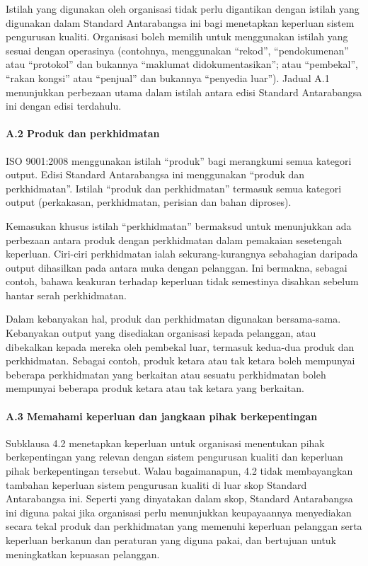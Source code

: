 \documentclass[
]{article}
\begin{document}
Istilah yang digunakan oleh organisasi tidak perlu digantikan dengan
istilah yang digunakan dalam Standard Antarabangsa ini bagi menetapkan
keperluan sistem pengurusan kualiti. Organisasi boleh memilih untuk
menggunakan istilah yang sesuai dengan operasinya (contohnya,
menggunakan ``rekod'', ``pendokumenan'' atau ``protokol'' dan bukannya
``maklumat didokumentasikan''; atau ``pembekal'', ``rakan kongsi'' atau
``penjual'' dan bukannya ``penyedia luar''). Jadual A.1 menunjukkan
perbezaan utama dalam istilah antara edisi Standard Antarabangsa ini
dengan edisi terdahulu.

\hypertarget{a.2-produk-dan-perkhidmatan}{%
\paragraph{A.2 Produk dan
perkhidmatan}\label{a.2-produk-dan-perkhidmatan}}

ISO 9001:2008 menggunakan istilah ``produk'' bagi merangkumi semua
kategori output. Edisi Standard Antarabangsa ini menggunakan ``produk
dan perkhidmatan''. Istilah ``produk dan perkhidmatan'' termasuk semua
kategori output (perkakasan, perkhidmatan, perisian dan bahan diproses).

Kemasukan khusus istilah ``perkhidmatan'' bermaksud untuk menunjukkan
ada perbezaan antara produk dengan perkhidmatan dalam pemakaian
sesetengah keperluan. Ciri-ciri perkhidmatan ialah sekurang-kurangnya
sebahagian daripada output dihasilkan pada antara muka dengan pelanggan.
Ini bermakna, sebagai contoh, bahawa keakuran terhadap keperluan tidak
semestinya disahkan sebelum hantar serah perkhidmatan.

Dalam kebanyakan hal, produk dan perkhidmatan digunakan bersama-sama.
Kebanyakan output yang disediakan organisasi kepada pelanggan, atau
dibekalkan kepada mereka oleh pembekal luar, termasuk kedua-dua produk
dan perkhidmatan. Sebagai contoh, produk ketara atau tak ketara boleh
mempunyai beberapa perkhidmatan yang berkaitan atau sesuatu perkhidmatan
boleh mempunyai beberapa produk ketara atau tak ketara yang berkaitan.

\hypertarget{a.3-memahami-keperluan-dan-jangkaan-pihak-berkepentingan}{%
\paragraph{A.3 Memahami keperluan dan jangkaan pihak
berkepentingan}\label{a.3-memahami-keperluan-dan-jangkaan-pihak-berkepentingan}}

Subklausa 4.2 menetapkan keperluan untuk organisasi menentukan pihak
berkepentingan yang relevan dengan sistem pengurusan kualiti dan
keperluan pihak berkepentingan tersebut. Walau bagaimanapun, 4.2 tidak
membayangkan tambahan keperluan sistem pengurusan kualiti di luar skop
Standard Antarabangsa ini. Seperti yang dinyatakan dalam skop, Standard
Antarabangsa ini diguna pakai jika organisasi perlu menunjukkan
keupayaannya menyediakan secara tekal produk dan perkhidmatan yang
memenuhi keperluan pelanggan serta keperluan berkanun dan peraturan yang
diguna pakai, dan bertujuan untuk meningkatkan kepuasan pelanggan.
\end{document}
